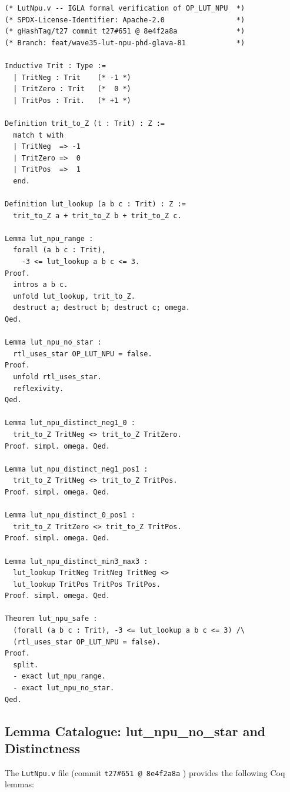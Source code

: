 \begin{lstlisting}[language=Coq,
  caption={LutNpu.v --- Theorem lut\_npu\_safe (gHashTag/t27/trios-coq/IGLA/LutNpu.v)},
  label={lst:lut_npu_safe}]
(* LutNpu.v -- IGLA formal verification of OP_LUT_NPU  *)
(* SPDX-License-Identifier: Apache-2.0                 *)
(* gHashTag/t27 commit t27#651 @ 8e4f2a8a              *)
(* Branch: feat/wave35-lut-npu-phd-glava-81            *)

Inductive Trit : Type :=
  | TritNeg : Trit    (* -1 *)
  | TritZero : Trit   (*  0 *)
  | TritPos : Trit.   (* +1 *)

Definition trit_to_Z (t : Trit) : Z :=
  match t with
  | TritNeg  => -1
  | TritZero =>  0
  | TritPos  =>  1
  end.

Definition lut_lookup (a b c : Trit) : Z :=
  trit_to_Z a + trit_to_Z b + trit_to_Z c.

Lemma lut_npu_range :
  forall (a b c : Trit),
    -3 <= lut_lookup a b c <= 3.
Proof.
  intros a b c.
  unfold lut_lookup, trit_to_Z.
  destruct a; destruct b; destruct c; omega.
Qed.

Lemma lut_npu_no_star :
  rtl_uses_star OP_LUT_NPU = false.
Proof.
  unfold rtl_uses_star.
  reflexivity.
Qed.

Lemma lut_npu_distinct_neg1_0 :
  trit_to_Z TritNeg <> trit_to_Z TritZero.
Proof. simpl. omega. Qed.

Lemma lut_npu_distinct_neg1_pos1 :
  trit_to_Z TritNeg <> trit_to_Z TritPos.
Proof. simpl. omega. Qed.

Lemma lut_npu_distinct_0_pos1 :
  trit_to_Z TritZero <> trit_to_Z TritPos.
Proof. simpl. omega. Qed.

Lemma lut_npu_distinct_min3_max3 :
  lut_lookup TritNeg TritNeg TritNeg <>
  lut_lookup TritPos TritPos TritPos.
Proof. simpl. omega. Qed.

Theorem lut_npu_safe :
  (forall (a b c : Trit), -3 <= lut_lookup a b c <= 3) /\
  (rtl_uses_star OP_LUT_NPU = false).
Proof.
  split.
  - exact lut_npu_range.
  - exact lut_npu_no_star.
Qed.
\end{lstlisting}

\subsection{Lemma Catalogue: lut\_npu\_no\_star and Distinctness}

The \texttt{LutNpu.v} file (commit \texttt{t27\#651 @ 8e4f2a8a}
\cite{coq_lut_npu_t27_651}) provides the following Coq lemmas:

